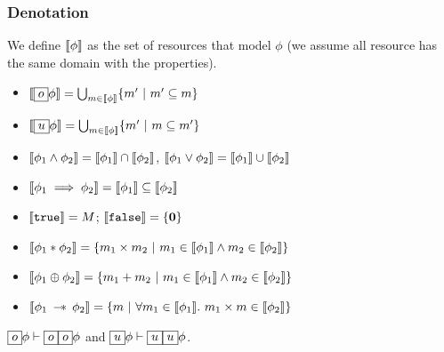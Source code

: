 \begin{frame}[fragile]
    \frametitle{Denotation}

\begin{definition}[Denotation] We define $\llbracket {\phi} \rrbracket$ as the set of resources that model $\phi$ (we assume all resource has the same domain with the properties).
\begin{itemize}
    \item $\llbracket {\boxed{o}\phi} \rrbracket = \bigcup_{m \in \llbracket {\phi} \rrbracket} \{ m' ~|~ m' \subseteq m \}$
    \item $\llbracket {\boxed{u}\phi} \rrbracket = \bigcup_{m \in \llbracket {\phi} \rrbracket} \{ m' ~|~ m \subseteq m' \}$
    \item $\llbracket {\phi_1 \land \phi_2} \rrbracket = \llbracket {\phi_1} \rrbracket \cap \llbracket {\phi_2} \rrbracket$, $\llbracket {\phi_1 \lor \phi_2} \rrbracket = \llbracket {\phi_1} \rrbracket \cup \llbracket {\phi_2} \rrbracket$
    \item $\llbracket {\phi_1 \implies \phi_2} \rrbracket = \llbracket {\phi_1} \rrbracket \subseteq \llbracket {\phi_2} \rrbracket$
    \item $\llbracket {{\tt true}} \rrbracket = M$;  $\llbracket {{\tt false}} \rrbracket = \{\mathbf{0}\}$
    \item $\llbracket {\phi_1 * \phi_2} \rrbracket = \{ m_1 \times m_2 ~|~ m_1 \in \llbracket {\phi_1} \rrbracket \land m_2 \in \llbracket {\phi_2} \rrbracket \}$
    \item $\llbracket {\phi_1 \oplus \phi_2} \rrbracket = \{ m_1 + m_2 ~|~ m_1 \in \llbracket {\phi_1} \rrbracket \land m_2 \in \llbracket {\phi_2} \rrbracket \}$
    \item $\denot{\phi_1 \wand \phi_2} = \{ m ~|~ \forall m_1 \in \denot{\phi_1}.\ m_1 \times m \in \denot{\phi_2} \}$
\end{itemize}
\end{definition}

\begin{lemma}[Idempotency]
    $\boxed{o}\phi \vdash \boxed{o}\boxed{o}\phi$ and $\boxed{u}\phi \vdash \boxed{u}\boxed{u}\phi$.
\end{lemma}

\end{frame}

